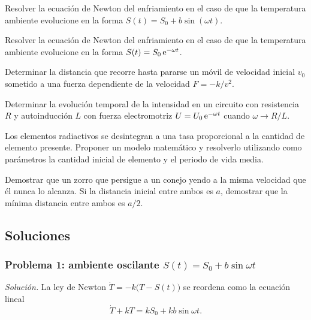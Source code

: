 \documentclass[11pt,twoside]{article}
\begin{document}
\begin{enunciado}
Resolver la ecuación de Newton del enfriamiento en el caso de que la temperatura ambiente evolucione en la forma
$S(t)=S_0+b\sin(\omega t)$.
\end{enunciado}
\begin{enunciado}
Resolver la ecuación de Newton del enfriamiento en el caso de que la temperatura ambiente evolucione en la forma
$S(t)=S_0\,\mathrm{e}^{-\omega t}$.
\end{enunciado}
\begin{enunciado}
Determinar la distancia que recorre hasta pararse un móvil de velocidad inicial $v_0$ sometido a una fuerza dependiente de
la velocidad $F=-k/v^2$.
\end{enunciado}
\begin{enunciado}
Determinar la evolución temporal de la intensidad en un circuito con resistencia $R$ y autoinducción $L$ con fuerza
electromotriz $U=U_0\,\mathrm{e}^{-\omega t}$ cuando $\omega\to R/L$.
\end{enunciado}
\begin{enunciado}
Los elementos radiactivos se desintegran a una tasa proporcional a la cantidad de elemento presente. Proponer un modelo
matemático y resolverlo utilizando como parámetros la cantidad inicial de elemento y el periodo de vida media.
\end{enunciado}
\begin{enunciado}
Demostrar que un zorro que persigue a un conejo yendo a la misma velocidad que él nunca lo alcanza. Si la distancia inicial
entre ambos es $a$, demostrar que la mínima distancia entre ambos es $a/2$.
\end{enunciado}

\subsection{Soluciones}

\subsubsection*{Problema 1: ambiente oscilante $S(t)=S_0+b\sin\omega t$}

\emph{Solución.} La ley de Newton $\dot T=-k\big(T-S(t)\big)$ se reordena como la ecuación lineal
\begin{equation}\label{eq:p1}
\dot T+kT=kS_0+kb\sin\omega t.
\end{equation}
\end{document}
